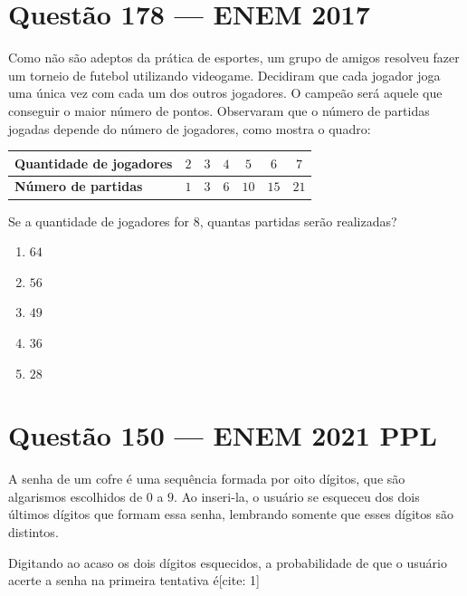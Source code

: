 \documentclass[11pt,a4paper]{article}
\begin{document}

\section*{Questão 178 --- ENEM 2017}

Como não são adeptos da prática de esportes, um grupo de amigos resolveu fazer um torneio de futebol utilizando videogame. Decidiram que cada jogador joga uma única vez com cada um dos outros jogadores. O campeão será aquele que conseguir o maior número de pontos. Observaram que o número de partidas jogadas depende do número de jogadores, como mostra o quadro:

\begin{center}
    \begin{tabular}{lcccccc}
        \toprule
        \textbf{Quantidade de jogadores} & $2$ & $3$ & $4$ & $5$  & $6$  & $7$  \\
        \midrule
        \textbf{Número de partidas}      & $1$ & $3$ & $6$ & $10$ & $15$ & $21$ \\
        \bottomrule
    \end{tabular}
\end{center}

Se a quantidade de jogadores for $8$, quantas partidas serão realizadas?

\begin{enumerate}[label=(\Alph*)]
    \item $64$
    \item $56$
    \item $49$
    \item $36$
    \item $28$
\end{enumerate}

\section*{Questão 150 --- ENEM 2021 PPL}

A senha de um cofre é uma sequência formada por oito dígitos, que são algarismos escolhidos de $0$ a $9$. Ao inseri-la, o usuário se esqueceu dos dois últimos dígitos que formam essa senha, lembrando somente que esses dígitos são distintos.

Digitando ao acaso os dois dígitos esquecidos, a probabilidade de que o usuário acerte a senha na primeira tentativa é[cite: 1]
\end{document}
